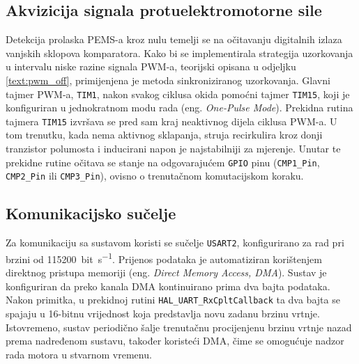 \documentclass[diplomskirad]{fer}
\begin{document}

\subsection{Akvizicija signala protuelektromotorne sile}
\label{ssec:akvizicija_pems}

Detekcija prolaska PEMS-a kroz nulu temelji se na očitavanju digitalnih izlaza
vanjskih sklopova komparatora. Kako bi se implementirala strategija uzorkovanja
u intervalu niske razine signala PWM-a, teorijski opisana u odjeljku
\ref{text:pwm_off}, primijenjena je metoda sinkroniziranog uzorkovanja. Glavni
tajmer PWM-a, \texttt{TIM1}, nakon svakog ciklusa okida pomoćni tajmer
\texttt{TIM15}, koji je konfiguriran u jednokratnom modu rada (eng.
\textit{One-Pulse Mode}). Prekidna rutina tajmera \texttt{TIM15} izvršava se
pred sam kraj neaktivnog dijela ciklusa PWM-a. U tom trenutku, kada nema
aktivnog sklapanja, struja recirkulira kroz donji tranzistor polumosta i
inducirani napon je najstabilniji za mjerenje. Unutar te prekidne rutine
očitava se stanje na odgovarajućem \texttt{GPIO} pinu (\texttt{CMP1\_Pin},
\texttt{CMP2\_Pin} ili \texttt{CMP3\_Pin}), ovisno o trenutačnom komutacijskom
koraku.


\subsection{Komunikacijsko sučelje}
\label{ssec:komunikacija}

Za komunikaciju sa sustavom koristi se sučelje \texttt{USART2}, konfigurirano
za rad pri brzini od \SI{115200}{bit\per\second}. Prijenos podataka je
automatiziran korištenjem direktnog pristupa memoriji (eng. \textit{Direct
	Memory Access, DMA}). Sustav je konfiguriran da preko kanala DMA kontinuirano
prima dva bajta podataka. Nakon primitka, u prekidnoj rutini
\texttt{HAL\_UART\_RxCpltCallback} ta dva bajta se spajaju u 16-bitnu
vrijednost koja predstavlja novu zadanu brzinu vrtnje. Istovremeno, sustav
periodično šalje trenutačnu procijenjenu brzinu vrtnje nazad prema nadređenom
sustavu, također koristeći DMA, čime se omogućuje nadzor rada motora u stvarnom
vremenu.
\end{document}
